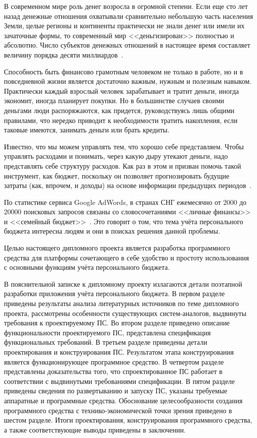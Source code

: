 \label{sec:introduction}

В современном мире роль денег возросла в огромной степени.
Если еще сто лет назад денежные отношения охватывали сравнительно небольшую часть населения Земли, целые регионы и континенты практически не знали денег или имели их зачаточные формы, то современный мир <<деньгизирован>> полностью и абсолютно.
Число субъектов денежных отношений в настоящее время составляет величину порядка десяти миллиардов~\cite{money_sorgin}.

Способность быть финансово грамотным человеком не только в работе, но и в повседневной жизни является достаточно важным, нужным и полезным навыком.
Практически каждый взрослый человек зарабатывает и тратит деньги, иногда экономит, иногда планирует покупки.
Но в большинстве случаев своими деньгами люди распоряжаются, как придется, руководствуясь лишь общими правилами, что нередко приводит к необходимости тратить накопления, если таковые имеются, занимать деньги или брать кредиты.

Известно, что мы можем управлять тем, что хорошо себе представляем.
Чтобы управлять расходами и понимать, через какую дыру утекают деньги, надо представлять себе структуру расходов.
Как раз в этом и призван помочь такой инструмент, как бюджет, поскольку он позволяет прогнозировать будущие затраты (как, впрочем, и доходы) на основе информации предыдущих периодов~\cite{money_under_control}.

По статистике сервиса Google AdWords, в странах СНГ ежемесячно от 2000 до 20000 поисковых запросов связаны со словосочетаниями <<личные финансы>> и <<семейный бюджет>>~\cite{google_adwords}.
Это говорит о том, что тема учёта персонального бюджета интересна людям и они в поисках решения данной проблемы.

Целью настоящего дипломного проекта является разработка программного средства для платформы \andro сочетающего в себе удобство и простоту использования с основными функциям учёта персонального бюджета.

В пояснительной записке к дипломному проекту излагаются детали поэтапной разработки приложения учёта персонального бюджета.
В первом разделе приведены результаты анализа литературных источников по теме дипломного проекта, рассмотрены особенности существующих систем-аналогов, выдвинуты требования к проектируемому ПС.
Во втором разделе приведено описание функциональности проектируемого ПС, представлена спецификация функциональных требований.
В третьем разделе приведены детали проектирования и конструирования ПС.
Результатом этапа конструирования является функционирующее программное средство.
В четвертом разделе представлены доказательства того, что спроектированное ПС работает в соответствии с выдвинутыми требованиями спецификации.
В пятом разделе приведены сведения по развертыванию и запуску ПС, указаны требуемые аппаратные и программные средства.
Обоснование целесообразности создания программного средства с технико-экономической точки зрения приведено в шестом разделе.
Итоги проектирования, конструирования программного средства, а также соответствующие выводы приведены в заключении.

